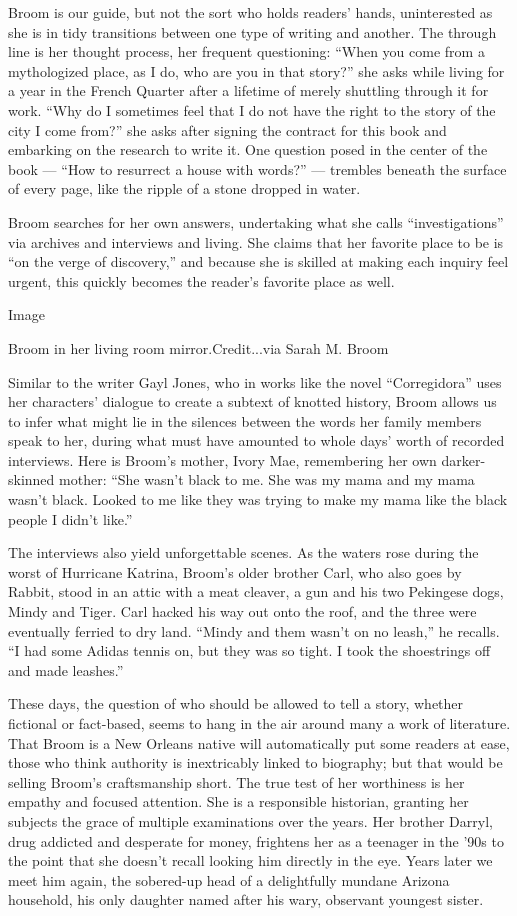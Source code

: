 Broom is our guide, but not the sort who holds readers' hands,
uninterested as she is in tidy transitions between one type of writing
and another. The through line is her thought process, her frequent
questioning: ``When you come from a mythologized place, as I do, who are
you in that story?'' she asks while living for a year in the French
Quarter after a lifetime of merely shuttling through it for work. ``Why
do I sometimes feel that I do not have the right to the story of the
city I come from?'' she asks after signing the contract for this book
and embarking on the research to write it. One question posed in the
center of the book --- ``How to resurrect a house with words?'' ---
trembles beneath the surface of every page, like the ripple of a stone
dropped in water.

Broom searches for her own answers, undertaking what she calls
``investigations'' via archives and interviews and living. She claims
that her favorite place to be is ``on the verge of discovery,'' and
because she is skilled at making each inquiry feel urgent, this quickly
becomes the reader's favorite place as well.

Image

Broom in her living room mirror.Credit...via Sarah M. Broom

Similar to the writer Gayl Jones, who in works like the novel
``Corregidora'' uses her characters' dialogue to create a subtext of
knotted history, Broom allows us to infer what might lie in the silences
between the words her family members speak to her, during what must have
amounted to whole days' worth of recorded interviews. Here is Broom's
mother, Ivory Mae, remembering her own darker-skinned mother: ``She
wasn't black to me. She was my mama and my mama wasn't black. Looked to
me like they was trying to make my mama like the black people I didn't
like.''

The interviews also yield unforgettable scenes. As the waters rose
during the worst of Hurricane Katrina, Broom's older brother Carl, who
also goes by Rabbit, stood in an attic with a meat cleaver, a gun and
his two Pekingese dogs, Mindy and Tiger. Carl hacked his way out onto
the roof, and the three were eventually ferried to dry land. ``Mindy and
them wasn't on no leash,'' he recalls. ``I had some Adidas tennis on,
but they was so tight. I took the shoestrings off and made leashes.''

These days, the question of who should be allowed to tell a story,
whether fictional or fact-based, seems to hang in the air around many a
work of literature. That Broom is a New Orleans native will
automatically put some readers at ease, those who think authority is
inextricably linked to biography; but that would be selling Broom's
craftsmanship short. The true test of her worthiness is her empathy and
focused attention. She is a responsible historian, granting her subjects
the grace of multiple examinations over the years. Her brother Darryl,
drug addicted and desperate for money, frightens her as a teenager in
the '90s to the point that she doesn't recall looking him directly in
the eye. Years later we meet him again, the sobered-up head of a
delightfully mundane Arizona household, his only daughter named after
his wary, observant youngest sister.

